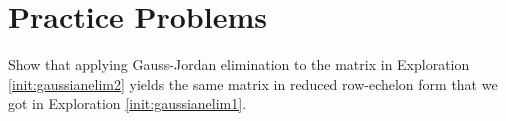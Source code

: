 \documentclass{ximera}
\begin{document}
 
 




      
   






\section*{Practice Problems}

\begin{problem}\label{prob:same_rref}
Show that applying Gauss-Jordan elimination to the matrix in Exploration \ref{init:gaussianelim2} yields the same matrix in reduced row-echelon form that we got in Exploration \ref{init:gaussianelim1}.
\end{problem}
\end{document}
